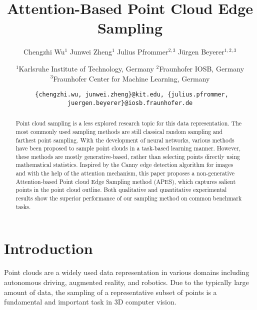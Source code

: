 \documentclass[10pt,twocolumn,letterpaper]{article}
\begin{document}
\title{\vspace{-0.2cm} Attention-Based Point Cloud Edge Sampling}

\author{Chengzhi Wu$^{1}$ \quad Junwei Zheng$^{1}$
\quad Julius Pfrommer$^{2,3}$ \quad Jürgen Beyerer$^{1,2,3}$ \and
$^{1}$Karlsruhe Institute of Technology, Germany \quad
$^{2}$Fraunhofer IOSB, Germany\\
$^{3}$Fraunhofer Center for Machine Learning, Germany \vspace{-0.2cm}
\and
{\tt\footnotesize
\{chengzhi.wu, junwei.zheng\}@kit.edu, \quad \{julius.pfrommer, juergen.beyerer\}@iosb.fraunhofer.de}
\vspace{-0.1cm}}

\maketitle

\begin{abstract}
Point cloud sampling is a less explored research topic for this data representation. The most commonly used sampling methods are still classical random sampling and farthest point sampling. With the development of neural networks, various methods have been proposed to sample point clouds in a task-based learning manner. However, these methods are mostly generative-based, rather than selecting points directly using mathematical statistics. Inspired by the Canny edge detection algorithm for images and with the help of the attention mechanism, this paper proposes a non-generative Attention-based Point cloud Edge Sampling method (APES), which captures salient points in the point cloud outline. Both qualitative and quantitative experimental results show the superior performance of our sampling method on common benchmark tasks. 
\vspace{-0.2cm}
\end{abstract}


\section{Introduction}
\label{sec:intro}
Point clouds are a widely used data representation in various domains including autonomous driving, augmented reality, and robotics. Due to the typically large amount of data, the sampling of a representative subset of points is a fundamental and important task in 3D computer vision.
\end{document}
